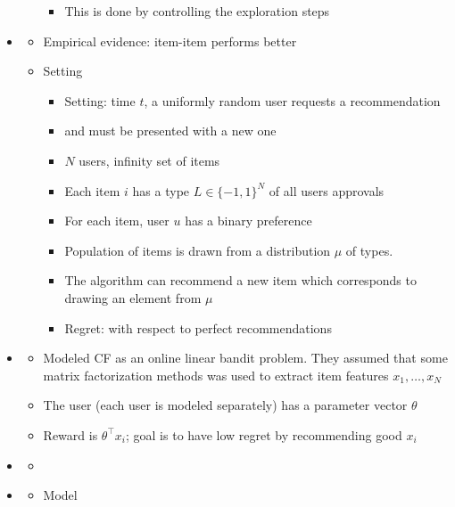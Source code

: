 \documentclass[11pt]{article}
\begin{document}
\begin{itemize}
\begin{itemize}
\begin{itemize}
    \item This is done by controlling the exploration steps
    \end{itemize}
  \end{itemize}
\item \cite{bresler2016collaborative}
  \begin{itemize}
  \item Empirical evidence: item-item performs better
  \item Setting
    \begin{itemize}
    \item Setting: time $t$, a uniformly random user requests a recommendation
    \item and must be presented with a new one
    \item $N$ users, infinity set of items
    \item Each item $i$ has a type $L \in \{-1,1\}^N$ of all users approvals
    \item For each item, user $u$ has a binary preference
    \item Population of items is drawn from a distribution $\mu$ of types. 
    \item The algorithm can recommend a new item which corresponds to drawing an element from $\mu$
    \item Regret: with respect to perfect recommendations
    \end{itemize}
  \end{itemize}  
\item \cite{deshpande2012linear}
  \begin{itemize}
  \item Modeled CF as an online linear bandit problem. They assumed that some matrix factorization methods was used to extract item features $x_1,\ldots, x_N$
  \item The user (each user is modeled separately) has a parameter vector $\theta$
  \item Reward is $\theta^\top x_i$; goal is to have low regret by recommending good $x_i$
  \end{itemize}
\item \cite{bresler2017regret}
  \begin{itemize}
  \item 
  \end{itemize}
\item \cite{song2016blind}
  \begin{itemize}
  \item Model
    \begin{itemize}

\end{itemize}
\end{itemize}
\end{itemize}
\end{document}

